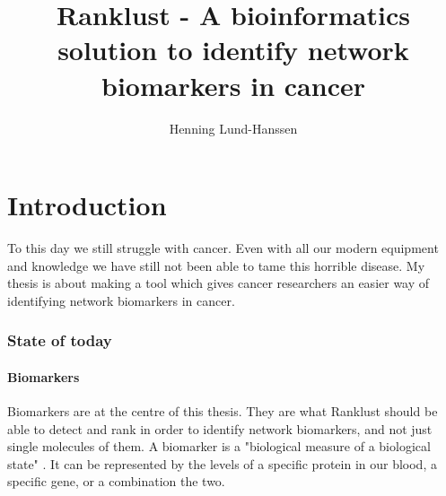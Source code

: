 \documentclass[UKenglish,11pt,a4paper]{article}
\title{Ranklust - A bioinformatics solution to identify network biomarkers in cancer}
\author{Henning Lund-Hanssen}
\begin{document}
\maketitle
\tableofcontents{}
\part{Introduction}
To this day we still struggle with cancer. Even with all our modern equipment and knowledge we have still not been able
to tame this horrible disease. My thesis is about making a tool which gives cancer researchers an easier way of
identifying network biomarkers in cancer. 
\section{State of today}
\subsection{Biomarkers}
Biomarkers are at the centre of this thesis. They are what Ranklust should be able to detect and rank in order to
identify network biomarkers, and not just single molecules of them. A biomarker is a "biological measure of a biological
state" \cite{biomarker1}. It can be represented by the levels of a specific protein in our blood, a specific gene, or a
combination the two.
\end{document}
